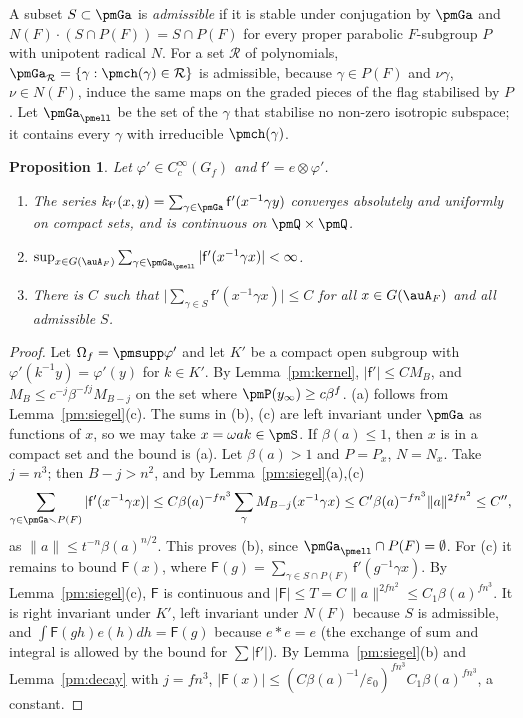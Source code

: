 \documentclass[10pt]{amsart}
\newtheorem{proposition}[theorem]{Proposition}
\theoremstyle{definition}
\theoremstyle{remark}
\begin{document}
A subset $S\subset\pmGa$ is \emph{admissible} if it is stable under conjugation by $\pmGa$ and
$N(F)\cdot(S\cap P(F))=S\cap P(F)$ for every proper parabolic $F$-subgroup $P$ with unipotent
radical $N$. For a set $\mathcal R$ of polynomials, $\pmGa_{\mathcal R}=\{\gamma:\pmch(\gamma)\in
\mathcal R\}$ is admissible, because $\gamma\in P(F)$ and $\nu\gamma$, $\nu\in N(F)$, induce the
same maps on the graded pieces of the flag stabilised by $P$. Let $\pmGa_\pmell$ be the set of
the $\gamma$ that stabilise no non-zero isotropic subspace; it contains every $\gamma$ with
irreducible $\pmch(\gamma)$.

\begin{proposition}\label{pm:bound}
Let $\varphi'\in C_c^\infty(G_f)$ and $\mathsf f'=e\otimes\varphi'$.
\begin{enumerate}
\item[(a)] The series $k_{\mathsf f'}(x,y)=\sum_{\gamma\in\pmGa}\mathsf f'(x^{-1}\gamma y)$ converges absolutely and
uniformly on compact sets, and is continuous on $\pmQ\times\pmQ$.
\item[(b)] $\sup_{x\in G(\auA_F)}\sum_{\gamma\in\pmGa_\pmell}|\mathsf f'(x^{-1}\gamma x)|<\infty$.
\item[(c)] There is $C$ such that $\bigl|\sum_{\gamma\in S}\mathsf f'(x^{-1}\gamma x)\bigr|\le C$ for all
$x\in G(\auA_F)$ and all admissible $S$.
\end{enumerate}
\end{proposition}
\begin{proof}
Let $\Omega_f=\pmsupp\varphi'$ and let $K'$ be a compact open subgroup with
$\varphi'(k^{-1}y)=\varphi'(y)$ for $k\in K'$. By Lemma~\ref{pm:kernel}, $|\mathsf f'|\le CM_B$, and
$M_B\le c^{-j}\beta^{-fj}M_{B-j}$ on the set where $\pmP(y_\infty)\ge c\beta^f$. (a) follows from
Lemma~\ref{pm:siegel}(c). The sums in (b), (c) are left invariant under $\pmGa$ as functions of
$x$, so we may take $x=\omega ak\in\pmS$. If $\beta(a)\le1$, then $x$
is in a compact set and the bound is (a). Let $\beta(a)>1$ and $P=P_x$, $N=N_x$. Take
$j=n^3$; then $B-j>n^2$, and by Lemma~\ref{pm:siegel}(a),(c)
\begin{equation}\label{pm:eq-far}
\sum_{\gamma\in\pmGa\smallsetminus P(F)}|\mathsf f'(x^{-1}\gamma x)|\le C\beta(a)^{-fn^3}\sum_\gamma M_{B-j}
(x^{-1}\gamma x)\le C'\beta(a)^{-fn^3}\|a\|^{2fn^2}\le C'' ,
\end{equation}
as $\|a\|\le t^{-n}\beta(a)^{n/2}$. This proves (b), since $\pmGa_\pmell\cap P(F)=\emptyset$. For
(c) it remains to bound $\mathsf F(x)$, where $\mathsf F(g)=\sum_{\gamma\in S\cap P(F)}\mathsf f'(g^{-1}\gamma
x)$. By Lemma~\ref{pm:siegel}(c), $\mathsf F$ is continuous and $|\mathsf F|\le T=C\|a\|^{2fn^2}\le
C_1\beta(a)^{fn^3}$. It is right invariant under $K'$, left invariant under $N(F)$ because $S$ is
admissible, and $\int\mathsf F(gh)e(h)dh=\mathsf F(g)$ because $e*e=e$ (the exchange of sum and
integral is allowed by the bound for $\sum|\mathsf f'|$). By Lemma~\ref{pm:siegel}(b) and
Lemma~\ref{pm:decay} with $j=fn^3$, $|\mathsf F(x)|\le(C\beta(a)^{-1}/\varepsilon_0)^{fn^3}C_1
\beta(a)^{fn^3}$, a constant.
\end{proof}
\end{document}
